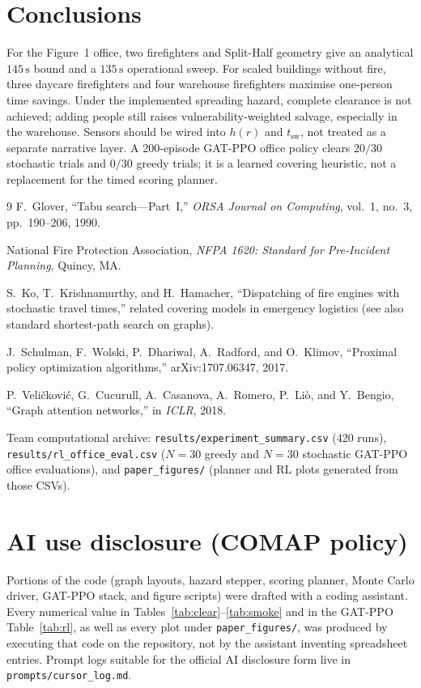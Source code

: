 \documentclass[12pt]{article}
\newcommand{\tsw}{t_{\mathrm{sw}}}
\begin{document}
\section{Conclusions}

For the Figure~1 office, two firefighters and Split-Half geometry give an
analytical \(145\,\mathrm{s}\) bound and a \(135\,\mathrm{s}\) operational sweep.
For scaled buildings without fire, three daycare firefighters and four warehouse
firefighters maximise one-person time savings. Under the implemented spreading
hazard, complete clearance is not achieved; adding people still raises
vulnerability-weighted salvage, especially in the warehouse. Sensors should be
wired into \(h(r)\) and \(\tsw\), not treated as a separate narrative layer.
A 200-episode GAT-PPO office policy clears \(20/30\) stochastic trials and
\(0/30\) greedy trials; it is a learned covering heuristic, not a replacement
for the timed scoring planner.

\begin{thebibliography}{9}
F.~Glover, ``Tabu search---Part~I,'' \emph{ORSA Journal on Computing},
vol.~1, no.~3, pp.~190--206, 1990.

National Fire Protection Association, \emph{NFPA 1620: Standard for
Pre-Incident Planning}, Quincy, MA.

S.~Ko, T.~Krishnamurthy, and H.~Hamacher, ``Dispatching of fire engines with
stochastic travel times,'' related covering models in emergency logistics
(see also standard shortest-path search on graphs).

J.~Schulman, F.~Wolski, P.~Dhariwal, A.~Radford, and O.~Klimov,
``Proximal policy optimization algorithms,'' arXiv:1707.06347, 2017.

P.~Veli{\v{c}}kovi{\'c}, G.~Cucurull, A.~Casanova, A.~Romero, P.~Li{\`o},
and Y.~Bengio, ``Graph attention networks,'' in \emph{ICLR}, 2018.

Team computational archive:
\texttt{results/experiment\_summary.csv} (420 runs),
\texttt{results/rl\_office\_eval.csv} (\(N=30\) greedy and \(N=30\) stochastic
GAT-PPO office evaluations), and \texttt{paper\_figures/} (planner and RL
plots generated from those CSVs).
\end{thebibliography}

\appendix
\section{AI use disclosure (COMAP policy)}
Portions of the code (graph layouts, hazard stepper, scoring planner, Monte Carlo
driver, GAT-PPO stack, and figure scripts) were drafted with a coding assistant.
Every numerical
value in Tables~\ref{tab:clear}--\ref{tab:smoke} and in the GAT-PPO
Table~\ref{tab:rl}, as well as every plot under \texttt{paper\_figures/},
was produced by executing that code on the repository, not by the assistant inventing
spreadsheet entries.
Prompt logs suitable for the official AI disclosure form live in
\texttt{prompts/cursor\_log.md}.
\end{document}
